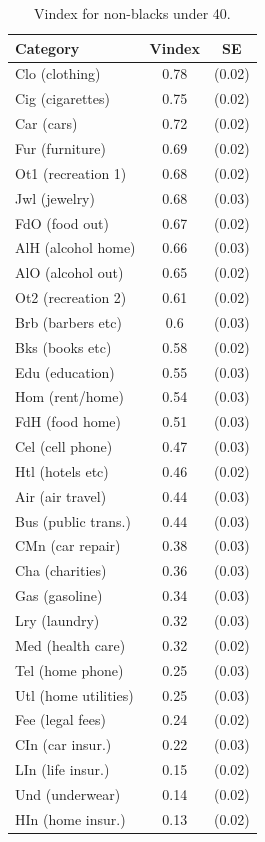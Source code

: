 \documentclass{article}
\begin{document}
\begin{table}
	\begin{center}
\begin{tabular}{|l|c|c|}
	\hline
	\textbf{Category} & \textbf{Vindex} & \textbf{SE} \\
	\hline
Clo (clothing) & 0.78 & (0.02)\\ 
	\hline
Cig (cigarettes) & 0.75 & (0.02)\\ 
	\hline
Car (cars) & 0.72 & (0.02)\\ 
	\hline
Fur (furniture) & 0.69 & (0.02)\\ 
	\hline
Ot1 (recreation 1) & 0.68 & (0.02)\\ 
	\hline
Jwl (jewelry) & 0.68 & (0.03)\\ 
	\hline
FdO (food out) & 0.67 & (0.02)\\ 
	\hline
AlH (alcohol home) & 0.66 & (0.03)\\ 
	\hline
AlO (alcohol out) & 0.65 & (0.02)\\ 
	\hline
Ot2 (recreation 2) & 0.61 & (0.02)\\ 
	\hline
Brb (barbers etc) & 0.6 & (0.03)\\ 
	\hline
Bks (books etc) & 0.58 & (0.02)\\ 
	\hline
Edu (education) & 0.55 & (0.03)\\ 
	\hline
Hom (rent/home) & 0.54 & (0.03)\\ 
	\hline
FdH (food home) & 0.51 & (0.03)\\ 
	\hline
Cel (cell phone) & 0.47 & (0.03)\\ 
	\hline
Htl (hotels etc) & 0.46 & (0.02)\\ 
	\hline
Air (air travel) & 0.44 & (0.03)\\ 
	\hline
Bus (public trans.) & 0.44 & (0.03)\\ 
	\hline
CMn (car repair) & 0.38 & (0.03)\\ 
	\hline
Cha (charities) & 0.36 & (0.03)\\ 
	\hline
Gas (gasoline) & 0.34 & (0.03)\\ 
	\hline
Lry (laundry) & 0.32 & (0.03)\\ 
	\hline
Med (health care) & 0.32 & (0.02)\\ 
	\hline
Tel (home phone) & 0.25 & (0.03)\\ 
	\hline
Utl (home utilities) & 0.25 & (0.03)\\ 
	\hline
Fee (legal fees) & 0.24 & (0.02)\\ 
	\hline
CIn (car insur.) & 0.22 & (0.03)\\ 
	\hline
LIn (life insur.) & 0.15 & (0.02)\\ 
	\hline
Und (underwear) & 0.14 & (0.02)\\ 
	\hline
HIn (home insur.) & 0.13 & (0.02)\\ 
	\hline
\end{tabular}
\end{center}
\label{tab:vintab}
\caption{Vindex for non-blacks under 40.}
\vspace{-2in}
\end{table}
\end{document}
